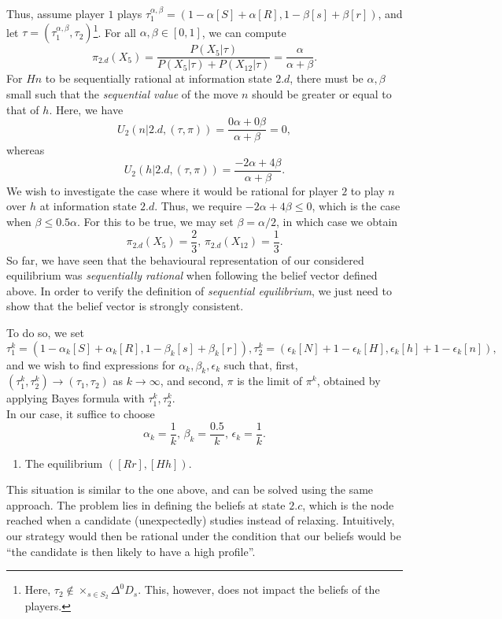 \begin{example}
Thus, assume player $1$ plays $\tau_1^{\alpha, \beta} = (1-\alpha[S] + \alpha [R],1-\beta[s] + \beta [r] )$, and let $\tau = (\tau_{1}^{\alpha, \beta}, \tau_2)$\footnote{Here, $\tau_2 \not \in \times_{s \in S_2} \Delta^0 D_s$. This, however, does not impact the beliefs of the players.}.
For all $\alpha, \beta \in [0,1]$, we can compute
$$\pi_{2.d}(X_5) = \frac{P(X_5 | \tau)}{ P(X_5 | \tau) + P(X_{12} | \tau) }  = \frac{\alpha}{\alpha + \beta}.$$
For $Hn$ to be sequentially rational at information state $2.d$, there must be $\alpha, \beta$ small such that the \emph{sequential value} of the move $n$ should be greater or equal to that of $h$. Here, we have
$$ U_2(n | 2.d, (\tau, \pi)) = \frac{0\alpha+0\beta}{\alpha+\beta} = 0 ,$$
whereas
$$U_2(h | 2.d, (\tau, \pi)) = \frac{-2 \alpha+ 4\beta}{\alpha+\beta}. $$
We wish to investigate the case where it would be rational for player $2$ to play $n$ over $h$ at information state $2.d$. Thus, we require $-2 \alpha+ 4\beta \leq 0$, which is the case when  $\beta \leq 0.5\alpha$. For this to be true, we may set $\beta = \alpha/2$, in which case we obtain
$$ \pi_{2.d}(X_5) = \frac{2}{3}, \, \pi_{2.d}(X_{12}) = \frac{1}{3}. $$
So far, we have seen that the behavioural representation of our considered equilibrium was \emph{sequentially rational} when following the belief vector defined above. In order to verify the definition of \emph{sequential equilibrium}, we just need to show that the belief vector is strongly consistent.

To do so, we set $$ \tau_1^k = (1 - \alpha_k [S] + \alpha_k [R], 1-\beta_k [s] + \beta_k [r]), \tau_2^k = (\epsilon_k [N] + 1 - \epsilon_k [H], \epsilon_k [h] +  1-\epsilon_k [n]), $$
and we wish to find expressions for $\alpha_k, \beta_k, \epsilon_k$ such that, first, $(\tau_1^k , \tau_2^k )\rightarrow (\tau_1, \tau_2)$ as $k \rightarrow \infty$, and second, $\pi$ is the limit of $\pi^k$, obtained by applying Bayes formula with $\tau_1^k, \tau_2^k$. \\
In our case, it suffice to choose
$$ \alpha_k =  \frac{1}{k}, \, \beta_k = \frac{0.5}{k}, \, \epsilon_k = \frac{1}{k}.$$


\begin{enumerate}[resume]
\item The equilibrium $([Rr], [Hh])$.
\end{enumerate}

This situation is similar to the one above, and can be solved using the same approach.
The problem lies in defining the beliefs at state $2.c$, which is the node reached when a candidate  (unexpectedly) studies instead of relaxing. Intuitively, our strategy would then be rational under the condition that our beliefs would be ``the candidate is then likely to have a high profile''.


\end{example}

